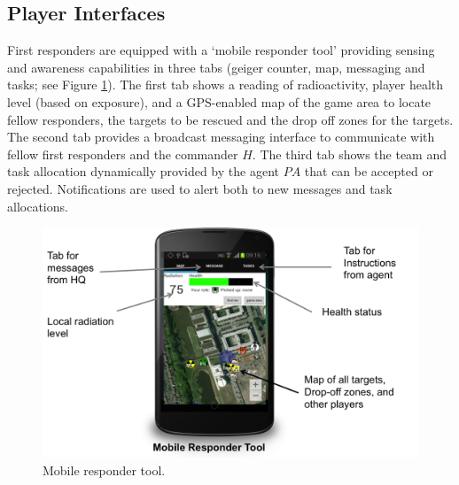 \subsection{Player Interfaces}
\noindent First responders are equipped with a `mobile responder tool' providing sensing and awareness capabilities in three tabs (geiger cou\-nter, map, messaging and tasks; see Figure \ref{fig:ui}). The first tab shows a reading of radioactivity, player health level (based on exposure), and a GPS-enabled map of the game area to locate fellow responders, the targets to be rescued and the drop off zones for the targets. The second tab provides a broadcast messaging interface to communicate with fellow first responders and the commander $H$. The third tab shows the team and task allocation dynamically provided by the agent $PA$ that can be accepted or rejected. Notifications are used to alert both to new messages and task allocations.

\begin{figure}[htbp]
\includegraphics[width=\columnwidth]{mobile_interface.png}
\caption{Mobile responder tool.}
\label{fig:ui}
\end{figure}


